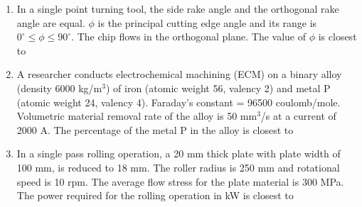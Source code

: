 \documentclass[journal,12pt,onecolumn]{IEEEtran}
\begin{document}
\begin{enumerate}
    \item In a single point turning tool, the side rake angle and the orthogonal rake angle are equal. $\phi$ is the principal cutting edge angle and its range is $0^\circ \le \phi \le 90^\circ$. The chip flows in the orthogonal plane. The value of $\phi$ is closest to\\

          \begin{enumerate}
          \end{enumerate}

    \item A researcher conducts electrochemical machining (ECM) on a binary alloy (density 6000 kg/m$^3$) of iron (atomic weight 56, valency 2) and metal P (atomic weight 24, valency 4). Faraday's constant = 96500 coulomb/mole. Volumetric material removal rate of the alloy is 50 mm$^3$/s at a current of 2000 A. The percentage of the metal P in the alloy is closest to\\

          \begin{enumerate}
          \end{enumerate}

    \item In a single pass rolling operation, a 20 mm thick plate with plate width of 100 mm, is reduced to 18 mm. The roller radius is 250 mm and rotational speed is 10 rpm. The average flow stress for the plate material is 300 MPa. The power required for the rolling operation in kW is closest to\\

          \begin{enumerate}
          \end{enumerate}


\end{enumerate}
\end{document}
